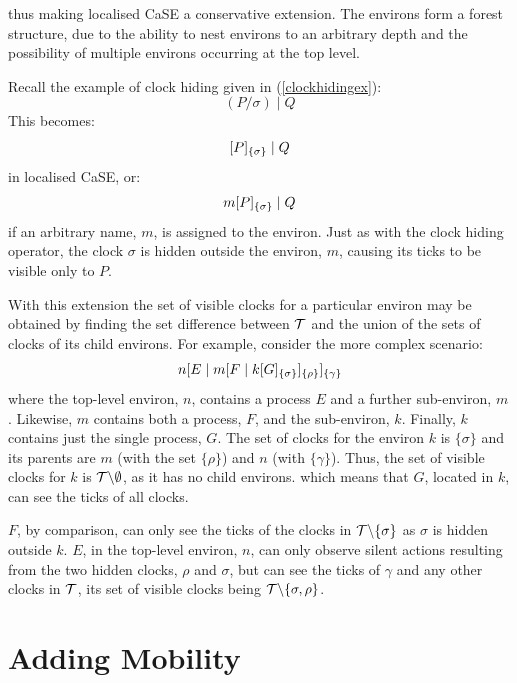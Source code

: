 \noindent thus making localised CaSE a conservative extension.  The
environs form a forest structure, due to the ability to nest
environs to an arbitrary depth and the possibility of multiple
environs occurring at the top level.

Recall the example of clock hiding given in (\ref{clockhidingex}):
\begin{equation}
  (P / \sigma)\;|\;Q
\end{equation}
This becomes:
\begin{equation}
  {}[ P ]_{\{\sigma\}}\;|\;Q
\end{equation}
in localised CaSE, or:
\begin{equation}
  {m}[ P ]_{\{\sigma\}}\;|\;Q
\end{equation}
if an arbitrary name, $m$, is assigned to the environ.  Just
as with the clock hiding operator, the clock $\sigma$ is hidden outside
the environ, $m$, causing its ticks to be visible only to $P$.  

With this extension the set of visible clocks for a particular environ
may be obtained by finding the set difference between $\text{$\mathcal{T}$}$ and
the union of the sets of clocks of its child environs.  For example,
consider the more complex scenario:
\begin{equation}
{n}[ E\;|\;{m}[ F\;|\;{k}[ G ]_{\{\sigma\}} ]_{\{\rho\}} ]_{\{\gamma\}}
\end{equation}
where the top-level environ, $n$, contains a process $E$ and a further
sub-environ, $m$.  Likewise, $m$ contains both a process, $F$, and the
sub-environ, $k$.  Finally, $k$ contains just the single process, $G$.
The set of clocks for the environ $k$ is $\{\sigma\}$ and its parents
are $m$ (with the set $\{\rho\}$) and $n$ (with $\{\gamma\}$).  Thus,
the set of visible clocks for $k$ is $\text{$\mathcal{T}$} \backslash \emptyset$,
as it has no child environs.  which means that $G$, located in $k$,
can see the ticks of all clocks.

$F$, by comparison, can only see the ticks of the clocks in $\text{$\mathcal{T}$}
\backslash \{\sigma\}$ as $\sigma$ is hidden outside $k$.  $E$, in the
top-level environ, $n$, can only observe silent actions resulting from
the two hidden clocks, $\rho$ and $\sigma$, but can see the ticks of
$\gamma$ and any other clocks in $\text{$\mathcal{T}$}$, its set of visible clocks
being $\text{$\mathcal{T}$} \backslash \{\sigma, \rho\}$.

\section{Adding Mobility}
\label{addingmob}

